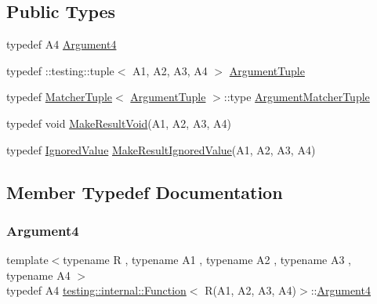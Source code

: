 \subsection*{Public Types}
\begin{DoxyCompactItemize}
\item 
typedef A4 \mbox{\hyperlink{structtesting_1_1internal_1_1_function_3_01_r_07_a1_00_01_a2_00_01_a3_00_01_a4_08_4_ae5039423598ab0fecd4f594acbf34d85}{Argument4}}
\item 
typedef \+::testing\+::tuple$<$ A1, A2, A3, A4 $>$ \mbox{\hyperlink{structtesting_1_1internal_1_1_function_3_01_r_07_a1_00_01_a2_00_01_a3_00_01_a4_08_4_a8ad9e0ae57a766f80a9816ad45626812}{Argument\+Tuple}}
\item 
typedef \mbox{\hyperlink{structtesting_1_1internal_1_1_matcher_tuple}{Matcher\+Tuple}}$<$ \mbox{\hyperlink{structtesting_1_1internal_1_1_function_3_01_r_07_08_4_ad483c3128c470d8cdb55c3ac1c575c11}{Argument\+Tuple}} $>$\+::type \mbox{\hyperlink{structtesting_1_1internal_1_1_function_3_01_r_07_a1_00_01_a2_00_01_a3_00_01_a4_08_4_a9524b18868ab632a90d4cb6917057a14}{Argument\+Matcher\+Tuple}}
\item 
typedef void \mbox{\hyperlink{structtesting_1_1internal_1_1_function_3_01_r_07_a1_00_01_a2_00_01_a3_00_01_a4_08_4_af7462da27e87a9d580e7f9748ebc5754}{Make\+Result\+Void}}(A1, A2, A3, A4)
\item 
typedef \mbox{\hyperlink{classtesting_1_1internal_1_1_ignored_value}{Ignored\+Value}} \mbox{\hyperlink{structtesting_1_1internal_1_1_function_3_01_r_07_a1_00_01_a2_00_01_a3_00_01_a4_08_4_a6736086d1c8ba25788add1e5180207f9}{Make\+Result\+Ignored\+Value}}(A1, A2, A3, A4)
\end{DoxyCompactItemize}


\subsection{Member Typedef Documentation}
\mbox{\label{structtesting_1_1internal_1_1_function_3_01_r_07_a1_00_01_a2_00_01_a3_00_01_a4_08_4_ae5039423598ab0fecd4f594acbf34d85}} 
\subsubsection{\texorpdfstring{Argument4}{Argument4}}
{\footnotesize\ttfamily template$<$typename R , typename A1 , typename A2 , typename A3 , typename A4 $>$ \\
typedef A4 \mbox{\hyperlink{structtesting_1_1internal_1_1_function}{testing\+::internal\+::\+Function}}$<$ R(A1, A2, A3, A4)$>$\+::\mbox{\hyperlink{structtesting_1_1internal_1_1_function_3_01_r_07_a1_00_01_a2_00_01_a3_00_01_a4_08_4_ae5039423598ab0fecd4f594acbf34d85}{Argument4}}}

